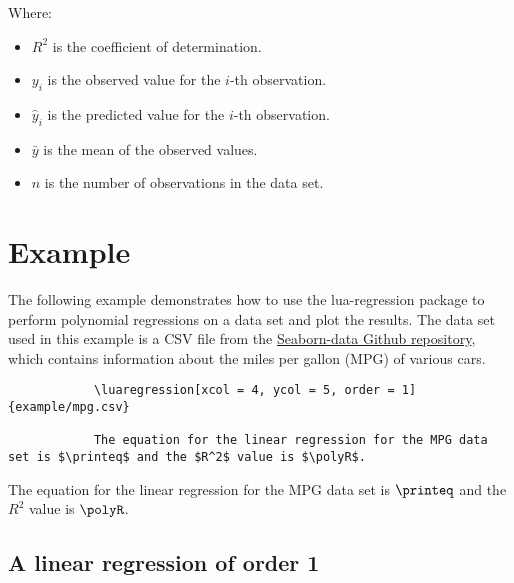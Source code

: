 \documentclass[11pt]{article}
\begin{document}
    
    Where:
    \begin{itemize}
        \item $R^2$ is the coefficient of determination.
        \item $y_i$ is the observed value for the $i$-th observation.
        \item $\hat{y}_i$ is the predicted value for the $i$-th observation.
        \item $\bar{y}$ is the mean of the observed values.
        \item $n$ is the number of observations in the data set.
    \end{itemize}

    \pagebreak

    \section{Example}

    The following example demonstrates how to use the {\ttfamily lua-regression} package to perform polynomial regressions on a data set and plot the results.
    The data set used in this example is a CSV file from the \href{https://github.com/mwaskom/seaborn-data}{Seaborn-data Github repository}, which contains information about the miles per gallon (MPG) of various cars.

    
   

	\begin{codebox2}
	    \begin{verbatim}
	        \luaregression[xcol = 4, ycol = 5, order = 1]{example/mpg.csv}
	
	        The equation for the linear regression for the MPG data set is $\printeq$ and the $R^2$ value is $\polyR$.
	    \end{verbatim}

	\tcblower
	

    
    The equation for the linear regression for the MPG data set is $\printeq$ and the $R^2$ value is $\polyR$.
     \end{codebox2}

    \pagebreak

    \subsection{A linear regression of order 1}
\end{document}

